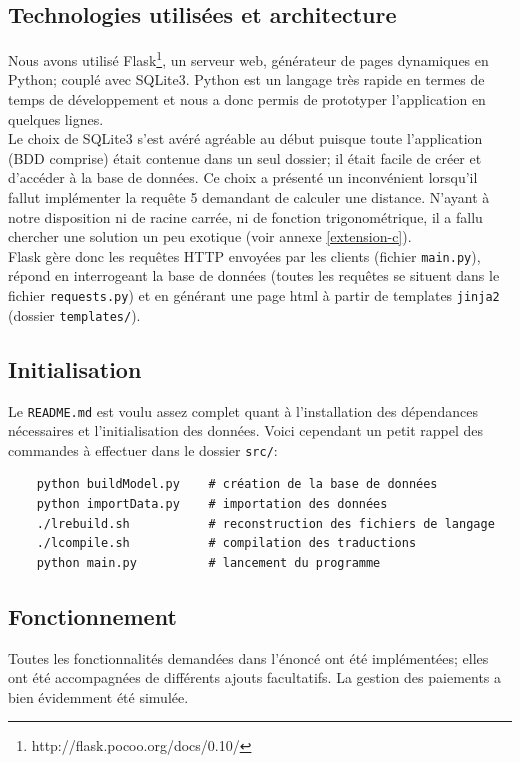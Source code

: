 \documentclass[a4paper]{article}
\begin{document}
    \subsection{Technologies utilisées et architecture}
    Nous avons utilisé Flask\footnote{http://flask.pocoo.org/docs/0.10/}, un serveur web, générateur de pages dynamiques en Python; couplé avec SQLite3. Python est un langage très rapide en termes de temps de développement et nous a donc permis de prototyper l'application en quelques lignes.\\
    
    Le choix de SQLite3 s'est avéré agréable au début puisque toute l'application (BDD comprise) était contenue dans un seul dossier; il était facile de créer et d'accéder à la base de données. Ce choix a présenté un inconvénient lorsqu'il fallut implémenter la requête 5 demandant de calculer une distance. N'ayant à notre disposition ni de racine carrée, ni de fonction trigonométrique, il a fallu chercher une solution un peu exotique (voir annexe \ref{extension-c}).\\
    
    Flask gère donc les requêtes HTTP envoyées par les clients (fichier \texttt{main.py}), répond en interrogeant la base de données (toutes les requêtes se situent dans le fichier \texttt{requests.py}) et en générant une page html à partir de templates \texttt{jinja2} (dossier \texttt{templates/}).
    
    \subsection{Initialisation}
    Le \texttt{README.md} est voulu assez complet quant à l'installation des dépendances nécessaires et l'initialisation des données. Voici cependant un petit rappel des commandes à effectuer dans le dossier \texttt{src/}:
    
    \begin{verbatim}
    python buildModel.py    # création de la base de données
    python importData.py    # importation des données
    ./lrebuild.sh           # reconstruction des fichiers de langage
    ./lcompile.sh           # compilation des traductions
    python main.py          # lancement du programme
    \end{verbatim}
    
    \subsection{Fonctionnement}
    Toutes les fonctionnalités demandées dans l'énoncé ont été implémentées; elles ont été accompagnées de différents ajouts facultatifs. La gestion des paiements a bien évidemment été simulée.
    
\end{document}
